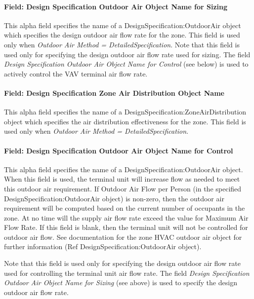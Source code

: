 \paragraph{Field: Design Specification Outdoor Air Object Name for Sizing}\label{field-design-specification-outdoor-air-object-name-for-sizing-2}

This alpha field specifies the name of a DesignSpecification:OutdoorAir object which specifies the design outdoor air flow rate for the zone. This field is used only when \emph{Outdoor Air Method = DetailedSpecification}. Note that this field is used only for specifying the design outdoor air flow rate used for sizing. The field \emph{Design Specification Outdoor Air Object Name for Control} (see below) is used to actively control the VAV terminal air flow rate.

\paragraph{Field: Design Specification Zone Air Distribution Object Name}\label{field-design-specification-zone-air-distribution-object-name-11}

This alpha field specifies the name of a DesignSpecification:ZoneAirDistribution object which specifies the air distribution effectiveness for the zone. This field is used only when \emph{Outdoor Air Method = DetailedSpecification}.

\paragraph{Field: Design Specification Outdoor Air Object Name for Control}\label{field-design-specification-outdoor-air-object-name-for-control-1}

This alpha field specifies the name of a DesignSpecification:OutdoorAir object. When this field is used, the terminal unit will increase flow as needed to meet this outdoor air requirement. If Outdoor Air Flow per Person (in the specified DesignSpecification:OutdoorAir object) is non-zero, then the outdoor air requirement will be computed based on the current number of occupants in the zone. At no time will the supply air flow rate exceed the value for Maximum Air Flow Rate. If this field is blank, then the terminal unit will not be controlled for outdoor air flow. See documentation for the zone HVAC outdoor air object for further information (Ref DesignSpecification:OutdoorAir object).

Note that this field is used only for specifying the design outdoor air flow rate used for controlling the terminal unit air flow rate. The field \emph{Design Specification Outdoor Air Object Name for Sizing} (see above) is used to specify the design outdoor air flow rate.

